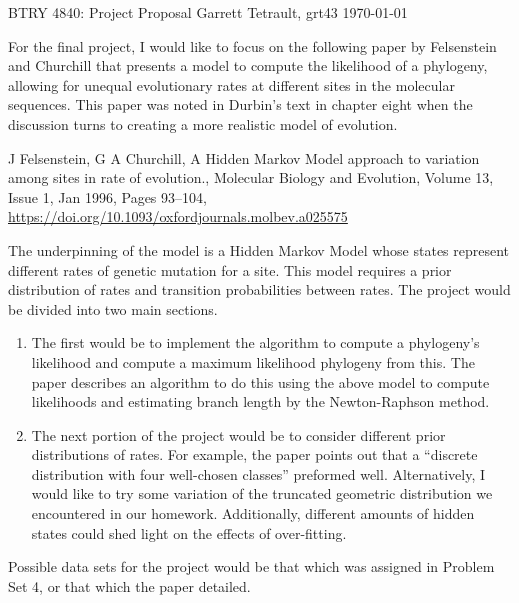 \documentclass[12pt]{article}
\begin{document}
\gtitle
    {BTRY 4840: Project Proposal}
    {Garrett Tetrault, grt43}
    {\today}
\sectionline

For the final project, I would like to focus on the following paper by Felsenstein and Churchill
that presents a model to compute the likelihood of a phylogeny,
allowing for unequal evolutionary rates at different sites in the molecular sequences.
This paper was noted in Durbin's text in chapter eight 
when the discussion turns to creating a more realistic model of evolution.
\begin{adjustwidth}{1in}{1in}
    J Felsenstein, G A Churchill, 
    A Hidden Markov Model approach to variation among sites in rate of evolution., 
    Molecular Biology and Evolution, Volume 13, Issue 1, Jan 1996, Pages 93–104, \\
    \url{https://doi.org/10.1093/oxfordjournals.molbev.a025575}
\end{adjustwidth}
The underpinning of the model is a Hidden Markov Model whose states represent
different rates of genetic mutation for a site.
This model requires a prior distribution of rates and transition probabilities between rates.
The project would be divided into two main sections.
\begin{enumerate}
    \item The first would be to implement the algorithm to compute a phylogeny's likelihood
    and compute a maximum likelihood phylogeny from this.
    The paper describes an algorithm to do this using the above model to compute likelihoods 
    and estimating branch length by the Newton-Raphson method.

    \item The next portion of the project would be to consider different prior distributions of rates.
    For example, the paper points out that 
    a ``discrete distribution with four well-chosen classes'' preformed well.
    Alternatively, I would like to try some variation of 
    the truncated geometric distribution we encountered in our homework.
    Additionally, different amounts of hidden states could shed light on the effects of over-fitting.
\end{enumerate}

Possible data sets for the project would be that which was assigned in Problem Set 4,
or that which the paper detailed.
\end{document}
